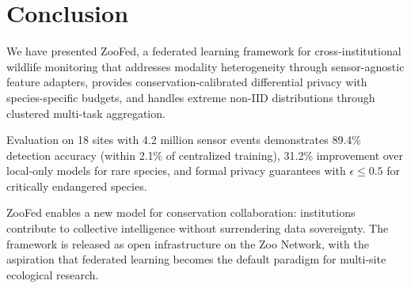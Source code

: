 \section{Conclusion}

\label{sec:conclusion}

We have presented ZooFed, a federated learning framework for cross-institutional wildlife monitoring that addresses modality heterogeneity through sensor-agnostic feature adapters, provides conservation-calibrated differential privacy with species-specific budgets, and handles extreme non-IID distributions through clustered multi-task aggregation.

Evaluation on 18 sites with 4.2 million sensor events demonstrates 89.4\% detection accuracy (within 2.1\% of centralized training), 31.2\% improvement over local-only models for rare species, and formal privacy guarantees with $\epsilon \leq 0.5$ for critically endangered species.

ZooFed enables a new model for conservation collaboration: institutions contribute to collective intelligence without surrendering data sovereignty.
The framework is released as open infrastructure on the Zoo Network, with the aspiration that federated learning becomes the default paradigm for multi-site ecological research.

